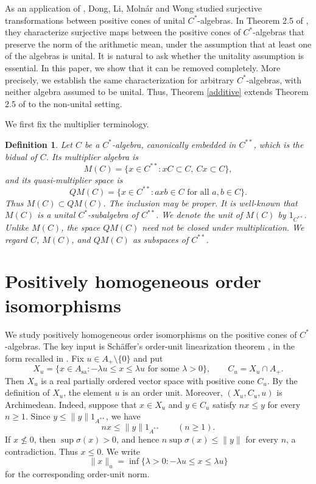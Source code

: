 \documentclass[12pt]{amsart}
\newtheorem{definition}[theorem]{Definition}
\theoremstyle{remark}
\newcommand{\sa}{\mathrm{sa}}
\begin{document}
As an application of \cite[Proposition~13]{MolnarRenyi}, Dong, Li, Moln\'ar and Wong
\cite{DongLiMolnarWong} studied surjective transformations between positive cones of unital $C^*$-algebras. In Theorem 2.5 of \cite{DongLiMolnarWong}, they characterize surjective maps between the positive cones of $C^*$-algebras that preserve the norm of the arithmetic mean, under the assumption that at least one of the algebras is unital. It is natural to ask whether the unitality assumption is essential. In this paper, we show that it can be removed completely. More precisely, we establish the same characterization for arbitrary $C^*$-algebras, with neither algebra assumed to be unital. Thus, Theorem \ref{additive} extends Theorem 2.5 of \cite{DongLiMolnarWong} to the non-unital setting. 

We first fix the multiplier terminology.
\begin{definition}\label{def:QM}
Let $C$ be a $C^*$-algebra, canonically embedded in $C^{**}$, which is the bidual of $C$.  Its
multiplier algebra is
\[
        M(C)
        =
        \{x\in C^{**}:xC\subset C,\ Cx\subset C\},
\]
and its quasi-multiplier space is
\[
        QM(C)
        =
        \{x\in C^{**}:axb\in C
          \text{ for all }a,b\in C\}.
\]
Thus $M(C)\subset QM(C)$. 
The inclusion may be proper. It is well-known that $M(C)$ is a unital $C^{*}$-subalgebra of $C^{**}$. We denote the unit of $M(C)$ by $1_{C^{**}}$.  Unlike $M(C)$, the space $QM(C)$ need
not be closed under multiplication. We regard $C$, $M(C)$, and $QM(C)$ as subspaces of $C^{**}$. 
\end{definition}


\section{Positively homogeneous order isomorphisms}\label{section2}
We study positively homogeneous order isomorphisms on the positive cones of $C^{*}$-algebras.  The key input is Sch\"affer's order-unit linearization theorem \cite[Theorem~B]{SchafferGauge}, in the
form recalled in \cite[Theorem~5.2]{LGI}.
Fix $u\in A_+\setminus\{0\}$ and put
\[
 X_u=\{x\in A_{\sa}: -\lambda u\le x\le \lambda u
       \text{ for some }\lambda>0\},
 \qquad
 C_u=X_u\cap A_+.
\]
Then $X_u$ is a real partially ordered vector space with positive cone
$C_u$.  By the definition of $X_u$, the element $u$ is an order unit.
Moreover, $(X_u,C_u,u)$ is Archimedean.  Indeed, suppose that $x\in X_u$
and $y\in C_u$ satisfy $nx\le y$ for every $n\ge1$.  Since
$y\le\|y\|1_{A^{**}}$, we have
\[
        nx\le\|y\|1_{A^{**}} \qquad(n\ge1).
\]
If $x\not\le0$, then $\sup\sigma(x)>0$, and hence
$n\sup\sigma(x)\le\|y\|$ for every $n$, a contradiction.  Thus $x\le0$.
We write
\[
 \|x\|_u=\inf\{\lambda>0:-\lambda u\le x\le\lambda u\}
\]
for the corresponding order-unit norm.
\end{document}
